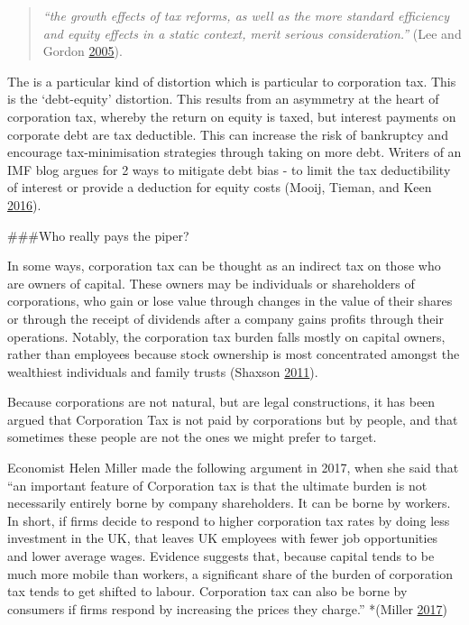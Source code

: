 \documentclass[]{tufte-handout}
\begin{document}
\begin{quote}
\emph{``the growth effects of tax reforms, as well as the more standard
efficiency and equity effects in a static context, merit serious
consideration.''} (Lee and Gordon
\protect\hyperlink{ref-Lee2005}{2005}).
\end{quote}

The is a particular kind of distortion which is particular to
corporation tax. This is the `debt-equity' distortion. This results from
an asymmetry at the heart of corporation tax, whereby the return on
equity is taxed, but interest payments on corporate debt are tax
deductible. This can increase the risk of bankruptcy and encourage
tax-minimisation strategies through taking on more debt. Writers of an
IMF blog argues for 2 ways to mitigate debt bias - to limit the tax
deductibility of interest or provide a deduction for equity costs
(Mooij, Tieman, and Keen \protect\hyperlink{ref-DeMooij2016}{2016}).

\#\#\#Who really pays the piper?

In some ways, corporation tax can be thought as an indirect tax on those
who are owners of capital. These owners may be individuals or
shareholders of corporations, who gain or lose value through changes in
the value of their shares or through the receipt of dividends after a
company gains profits through their operations. Notably, the corporation
tax burden falls mostly on capital owners, rather than employees because
stock ownership is most concentrated amongst the wealthiest individuals
and family trusts (Shaxson \protect\hyperlink{ref-Shaxson2011}{2011}).

Because corporations are not natural, but are legal constructions, it
has been argued that Corporation Tax is not paid by corporations but by
people, and that sometimes these people are not the ones we might prefer
to target.

Economist Helen Miller made the following argument in 2017, when she
said that ``an important feature of Corporation tax is that the ultimate
burden is not necessarily entirely borne by company shareholders. It can
be borne by workers. In short, if firms decide to respond to higher
corporation tax rates by doing less investment in the UK, that leaves UK
employees with fewer job opportunities and lower average wages. Evidence
suggests that, because capital tends to be much more mobile than
workers, a significant share of the burden of corporation tax tends to
get shifted to labour. Corporation tax can also be borne by consumers if
firms respond by increasing the prices they charge.'' *(Miller
\protect\hyperlink{ref-Miller2017}{2017})
\end{document}
